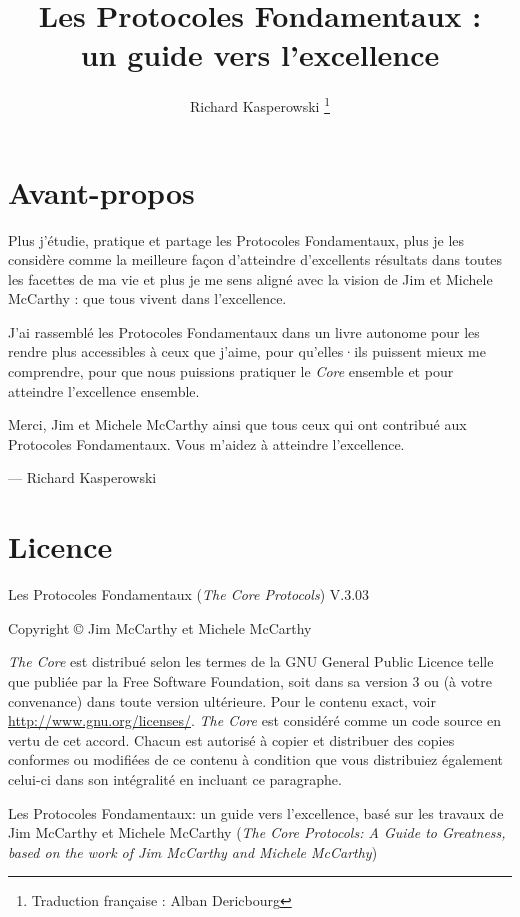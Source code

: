 \documentclass[11pt]{book}
\author{Richard Kasperowski \thanks{Traduction française : Alban Dericbourg}}
\title{Les Protocoles Fondamentaux :\\un guide vers l'excellence}
\begin{document}
\frontmatter

\maketitle

\setcounter{secnumdepth}{1}
\setcounter{tocdepth}{1}
\tableofcontents

\setlength{\parskip}{0.5em}

\chapter{Avant-propos}

Plus j'étudie, pratique et partage les Protocoles Fondamentaux, plus je les considère comme la meilleure façon d'atteindre
d'excellents résultats dans toutes les facettes de ma vie et plus je me sens aligné avec la vision de Jim et Michele McCarthy :
que tous vivent dans l'excellence.

J'ai rassemblé les Protocoles Fondamentaux dans un livre autonome pour les rendre plus accessibles à ceux que j'aime, pour
qu'elles·ils puissent mieux me comprendre, pour que nous puissions pratiquer le \emph{Core} ensemble et pour atteindre
l'excellence ensemble.

Merci, Jim et Michele McCarthy ainsi que tous ceux qui ont contribué aux Protocoles Fondamentaux. Vous m'aidez à atteindre
l'excellence.

--- Richard Kasperowski


\chapter{Licence}

Les Protocoles Fondamentaux (\emph{The Core Protocols}) V.3.03

Copyright \copyright{} Jim McCarthy et Michele McCarthy

\emph{The Core} est distribué selon les termes de la GNU General Public Licence telle que publiée par la Free Software
Foundation, soit dans sa version 3 ou (à votre convenance) dans toute version ultérieure. Pour le contenu exact, voir
\url{http://www.gnu.org/licenses/}. \emph{The Core} est considéré comme un code source en vertu de cet accord. Chacun est autorisé
à copier et distribuer des copies conformes ou modifiées de ce contenu à condition que vous distribuiez également celui-ci
dans son intégralité en incluant ce paragraphe.

Les Protocoles Fondamentaux: un guide vers l'excellence, basé sur les travaux de Jim McCarthy et Michele McCarthy
(\emph{The Core Protocols: A Guide to Greatness, based on the work of Jim McCarthy and Michele McCarthy})
\end{document}
